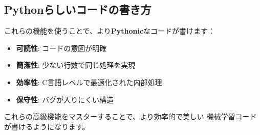 \documentclass{ltjsarticle}      %
\begin{document}
\subsection{Pythonらしいコードの書き方}
これらの機能を使うことで、より\textbf{Pythonic}なコードが書けます：

\begin{itemize}
    \item \textbf{可読性}: コードの意図が明確
    \item \textbf{簡潔性}: 少ない行数で同じ処理を実現
    \item \textbf{効率性}: C言語レベルで最適化された内部処理
    \item \textbf{保守性}: バグが入りにくい構造
\end{itemize}

これらの高級機能をマスターすることで、より効率的で美しい
機械学習コードが書けるようになります。
\end{document}
